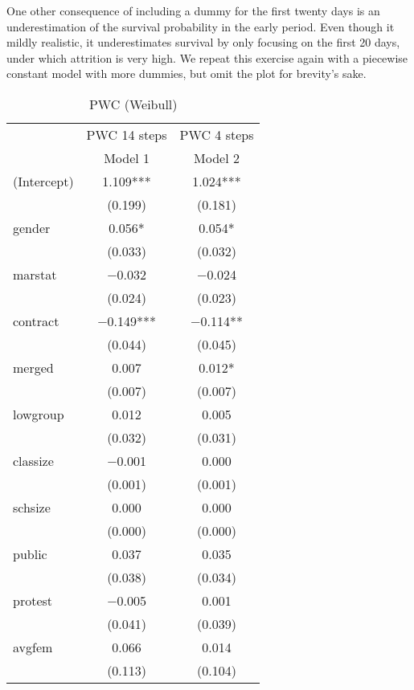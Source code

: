 \documentclass[
]{article}
\begin{document}
One other consequence of including a dummy for the first twenty days is
an underestimation of the survival probability in the early period. Even
though it mildly realistic, it underestimates survival by only focusing
on the first 20 days, under which attrition is very high. We repeat this
exercise again with a piecewise constant model with more dummies, but
omit the plot for brevity's sake.

\begin{table}[!h]

\caption{\label{tab:unnamed-chunk-18}PWC (Weibull)}
\centering
\fontsize{8}{10}\selectfont
\begin{tabular}[t]{lcc}
\toprule
\multicolumn{1}{c}{ } & \multicolumn{1}{c}{PWC 14 steps} & \multicolumn{1}{c}{PWC 4 steps} \\
\cmidrule(l{3pt}r{3pt}){2-2} \cmidrule(l{3pt}r{3pt}){3-3}
  & Model 1 & Model 2\\
\midrule
(Intercept) & \num{1.109}*** & \num{1.024}***\\
 & (\num{0.199}) & (\num{0.181})\\
gender & \num{0.056}* & \num{0.054}*\\
 & (\num{0.033}) & (\num{0.032})\\
marstat & \num{-0.032} & \num{-0.024}\\
 & (\num{0.024}) & (\num{0.023})\\
contract & \num{-0.149}*** & \num{-0.114}**\\
 & (\num{0.044}) & (\num{0.045})\\
merged & \num{0.007} & \num{0.012}*\\
 & (\num{0.007}) & (\num{0.007})\\
lowgroup & \num{0.012} & \num{0.005}\\
 & (\num{0.032}) & (\num{0.031})\\
classize & \num{-0.001} & \num{0.000}\\
 & (\num{0.001}) & (\num{0.001})\\
schsize & \num{0.000} & \num{0.000}\\
 & (\num{0.000}) & (\num{0.000})\\
public & \num{0.037} & \num{0.035}\\
 & (\num{0.038}) & (\num{0.034})\\
protest & \num{-0.005} & \num{0.001}\\
 & (\num{0.041}) & (\num{0.039})\\
avgfem & \num{0.066} & \num{0.014}\\
 & (\num{0.113}) & (\num{0.104})\\

\end{tabular}
\end{table}
\end{document}
